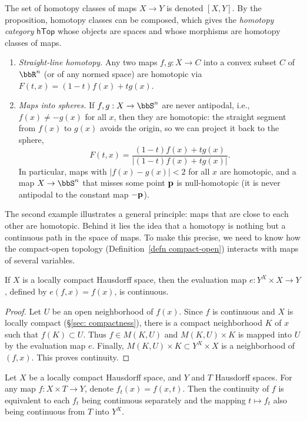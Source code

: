 The set of homotopy classes of maps $X\to Y$ is denoted $[X,Y]$. By the proposition, homotopy classes can be composed, which gives the \emph{homotopy category} $\mathsf{hTop}$ whose objects are spaces and whose morphisms are homotopy classes of maps.

\begin{example}\label{example homotopies}
    \begin{enumerate}
        \item \emph{Straight-line homotopy.} Any two maps $f,g:X\to C$ into a convex subset $C$ of $\bbR^n$ (or of any normed space) are homotopic via $F(t,x)=(1-t)f(x)+tg(x)$.
        \item \emph{Maps into spheres.} If $f,g:X\to\bbS^n$ are never antipodal, i.e., $f(x)\neq-g(x)$ for all $x$, then they are homotopic: the straight segment from $f(x)$ to $g(x)$ avoids the origin, so we can project it back to the sphere,
        \[F(t,x)=\frac{(1-t)f(x)+tg(x)}{\lvert(1-t)f(x)+tg(x)\rvert}.\]
        In particular, maps with $\lvert f(x)-g(x)\rvert<2$ for all $x$ are homotopic, and a map $X\to\bbS^n$ that misses some point $\bf{p}$ is null-homotopic (it is never antipodal to the constant map $-\bf{p}$).
    \end{enumerate}
\end{example}

The second example illustrates a general principle: maps that are close to each other are homotopic. Behind it lies the idea that a homotopy is nothing but a continuous path in the space of maps. To make this precise, we need to know how the compact-open topology (Definition~\ref{defn compact-open}) interacts with maps of several variables.

\begin{prop}
    If $X$ is a locally compact Hausdorff space, then the evaluation map $e:Y^X\times X\to Y$, defined by $e(f,x)=f(x)$, is continuous.
\end{prop}
\begin{proof}
    Let $U$ be an open neighborhood of $f(x)$. Since $f$ is continuous and $X$ is locally compact (\S\ref{sec: compactness}), there is a compact neighborhood $K$ of $x$ such that $f(K)\subset U$. Thus $f\in M(K,U)$ and $M(K,U)\times K$ is mapped into $U$ by the evaluation map $e$. Finally, $M(K,U)\times K \subset Y^X\times X$ is a neighborhood of $(f,x)$. This proves continuity.
\end{proof}

\begin{thm}\label{compact open continuity}
    Let $X$ be a locally compact Hausdorff space, and $Y$ and $T$ Hausdorff spaces. For any map $f:X\times T\to Y$, denote $f_t(x)=f(x,t)$. Then the continuity of $f$ is equivalent to each $f_t$ being continuous separately and the mapping $t\mapsto f_t$ also being continuous from $T$ into $Y^X$. 
\end{thm}


